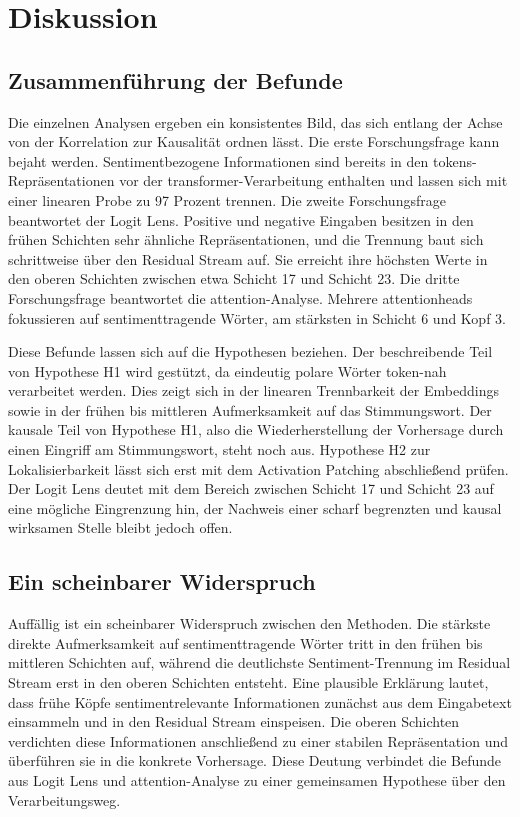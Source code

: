 \section{Diskussion}

\subsection{Zusammenführung der Befunde}

Die einzelnen Analysen ergeben ein konsistentes Bild, das sich entlang der Achse von der Korrelation zur Kausalität ordnen lässt. Die erste Forschungsfrage kann bejaht werden. Sentimentbezogene Informationen sind bereits in den \glspl{token}-Repräsentationen vor der \gls{transformer}-Verarbeitung enthalten und lassen sich mit einer linearen Probe zu 97 Prozent trennen. Die zweite Forschungsfrage beantwortet der Logit Lens. Positive und negative Eingaben besitzen in den frühen Schichten sehr ähnliche Repräsentationen, und die Trennung baut sich schrittweise über den Residual Stream auf. Sie erreicht ihre höchsten Werte in den oberen Schichten zwischen etwa Schicht 17 und Schicht 23. Die dritte Forschungsfrage beantwortet die \gls{attention}-Analyse. Mehrere \glspl{attentionhead} fokussieren auf sentimenttragende Wörter, am stärksten in Schicht 6 und Kopf 3.

Diese Befunde lassen sich auf die Hypothesen beziehen. Der beschreibende Teil von Hypothese H1 wird gestützt, da eindeutig polare Wörter token-nah verarbeitet werden. Dies zeigt sich in der linearen Trennbarkeit der Embeddings sowie in der frühen bis mittleren Aufmerksamkeit auf das Stimmungswort. Der kausale Teil von Hypothese H1, also die Wiederherstellung der Vorhersage durch einen Eingriff am Stimmungswort, steht noch aus. Hypothese H2 zur Lokalisierbarkeit lässt sich erst mit dem Activation Patching abschließend prüfen. Der Logit Lens deutet mit dem Bereich zwischen Schicht 17 und Schicht 23 auf eine mögliche Eingrenzung hin, der Nachweis einer scharf begrenzten und kausal wirksamen Stelle bleibt jedoch offen.

\subsection{Ein scheinbarer Widerspruch}

Auffällig ist ein scheinbarer Widerspruch zwischen den Methoden. Die stärkste direkte Aufmerksamkeit auf sentimenttragende Wörter tritt in den frühen bis mittleren Schichten auf, während die deutlichste Sentiment-Trennung im Residual Stream erst in den oberen Schichten entsteht. Eine plausible Erklärung lautet, dass frühe Köpfe sentimentrelevante Informationen zunächst aus dem Eingabetext einsammeln und in den Residual Stream einspeisen. Die oberen Schichten verdichten diese Informationen anschließend zu einer stabilen Repräsentation und überführen sie in die konkrete Vorhersage. Diese Deutung verbindet die Befunde aus Logit Lens und \gls{attention}-Analyse zu einer gemeinsamen Hypothese über den Verarbeitungsweg.

